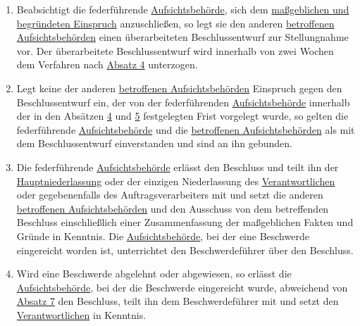 \begin{enumerate}
  \item Beabsichtigt die federführende \hyperref[itm:04-21]{Aufsichtsbehörde}, sich dem \hyperref[itm:04-27]{maßgeblichen und begründeten Einspruch} anzuschließen,
   so legt sie den anderen \hyperref[itm:04-22]{betroffenen Aufsichtsbehörden} einen überarbeiteten Beschlussentwurf zur Stellungnahme vor.
   Der überarbeitete Beschlussentwurf wird innerhalb von zwei Wochen dem Verfahren nach \hyperref[itm:60-4]{Absatz 4}
   unterzogen.
  \label{itm:60-5}

  \item Legt keine der anderen \hyperref[itm:04-22]{betroffenen Aufsichtsbehörden} Einspruch gegen den Beschlussentwurf ein, der von der
   federführenden \hyperref[itm:04-21]{Aufsichtsbehörde} innerhalb der in den Absätzen \hyperref[itm:60-4]{4} und \hyperref[itm:60-5]
   {5} festgelegten Frist vorgelegt wurde, so gelten die federführende \hyperref[itm:04-21]{Aufsichtsbehörde} und die \hyperref[itm:04-22]{betroffenen
   Aufsichtsbehörden} als mit dem Beschlussentwurf einverstanden und sind an ihn gebunden.
  \label{itm:60-6}

  \item Die federführende \hyperref[itm:04-21]{Aufsichtsbehörde} erlässt den Beschluss und teilt ihn der \hyperref[itm:04-16]{Hauptniederlassung} oder der einzigen
   Niederlassung des \hyperref[itm:04-7]{Verantwortlichen} oder gegebenenfalls des Auftragsverarbeiters mit und setzt die anderen
   \hyperref[itm:04-22]{betroffenen Aufsichtsbehörden} und den Ausschuss von dem betreffenden Beschluss einschließlich einer Zusammenfassung
   der maßgeblichen Fakten und Gründe in Kenntnis. Die \hyperref[itm:04-21]{Aufsichtsbehörde}, bei der eine Beschwerde eingereicht worden
   ist, unterrichtet den Beschwerdeführer über den Beschluss.
  \label{itm:60-7}

  \item Wird eine Beschwerde abgelehnt oder abgewiesen, so erlässt die \hyperref[itm:04-21]{Aufsichtsbehörde}, bei der die Beschwerde
   eingereicht wurde, abweichend von \hyperref[itm:60-7]{Absatz 7} den Beschluss, teilt ihn dem Beschwerdeführer mit
   und setzt den \hyperref[itm:04-7]{Verantwortlichen} in Kenntnis.
  \label{itm:60-8}


\end{enumerate}
